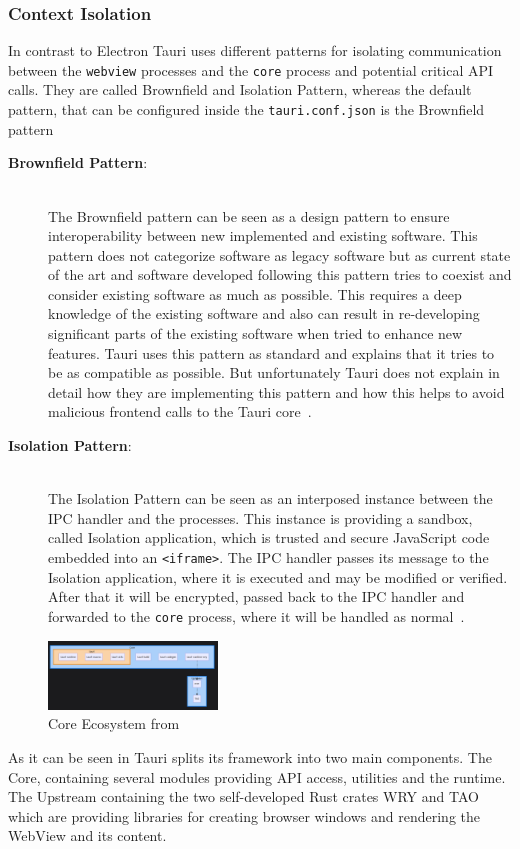 \subsubsection{Context Isolation}
In contrast to Electron Tauri uses different patterns for isolating communication between the \texttt{webview} processes and the \texttt{core} process and potential critical \ac{API} calls.
They are called Brownfield and Isolation Pattern, whereas the default pattern, that can be configured inside the \texttt{tauri.conf.json} is the Brownfield pattern
\begin{description}
    \item[\textbf{Brownfield Pattern}:] \hfill \\
    The Brownfield pattern can be seen as a design pattern to ensure interoperability between new implemented and existing software.
    This pattern does not categorize software as legacy software but as current state of the art and software developed following this pattern tries to coexist and consider existing software as much as possible.
    This requires a deep knowledge of the existing software and also can result in re-developing significant parts of the existing software when tried to enhance new features.
    Tauri uses this pattern as standard and explains that it tries to be as compatible as possible.
    But unfortunately Tauri does not explain in detail how they are implementing this pattern and how this helps to avoid malicious frontend calls to the Tauri core~\cite{tauri}.
    \item[\textbf{Isolation Pattern}:] \hfill \\
    The Isolation Pattern can be seen as an interposed instance between the \ac{IPC} handler and the processes.
    This instance is providing a sandbox, called Isolation application, which is trusted and secure JavaScript code embedded into an \texttt{<iframe>}.
    The \ac{IPC} handler passes its message to the Isolation application, where it is executed and may be modified or verified.
    After that it will be encrypted, passed back to the \ac{IPC} handler and forwarded to the \texttt{core} process, where it will be handled as normal~\cite{tauri}.


\end{description}

\begin{figure}[ht]
    \centering
    \includegraphics[width=0.4\textwidth]{images/TauriCore}
    \caption{Core Ecosystem from~\cite{tauri}}
    \label{fig:tauri:core}
\end{figure}
As it can be seen in  Tauri splits its framework into two main components.
The Core, containing several modules providing \ac{API} access, utilities and the runtime.
The Upstream containing the two self-developed Rust crates WRY and TAO which are providing libraries for creating browser windows and rendering the WebView and its content.

